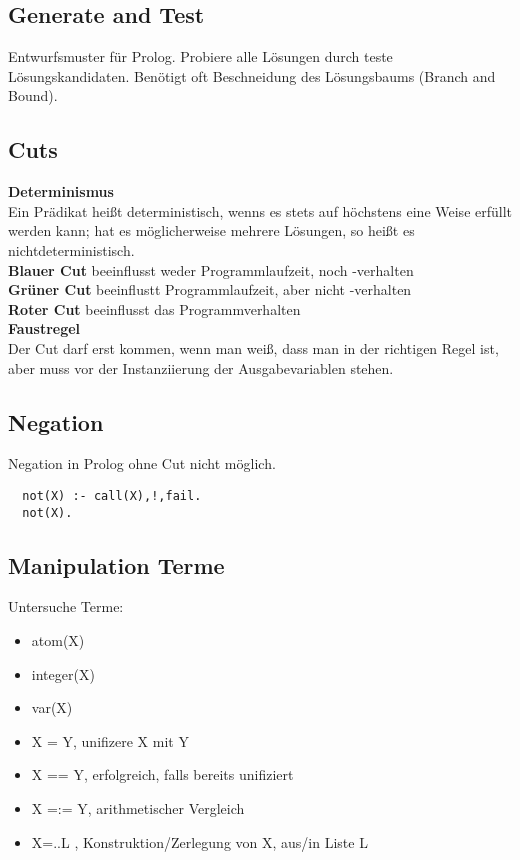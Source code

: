 \subsection{Generate and Test}%
\label{lp:sub:generate-and-test}
Entwurfsmuster für Prolog. Probiere alle Lösungen durch teste Lösungskandidaten. Benötigt oft Beschneidung des
Lösungsbaums (Branch and Bound).

\subsection{Cuts}%
\label{lp:sub:cuts}
\textbf{Determinismus}\\
Ein Prädikat heißt deterministisch, wenns es stets auf höchstens eine Weise erfüllt werden kann; hat es
möglicherweise mehrere Lösungen, so heißt es nichtdeterministisch.\\

\textbf{Blauer Cut} beeinflusst weder Programmlaufzeit, noch -verhalten\\
\textbf{Grüner Cut} beeinflustt Programmlaufzeit, aber nicht -verhalten\\
\textbf{Roter Cut} beeinflusst das Programmverhalten\\

\textbf{Faustregel}\\
Der Cut darf erst kommen, wenn man weiß, dass man in der richtigen Regel ist, aber muss vor der
Instanziierung der Ausgabevariablen stehen.

\subsection{Negation}%
\label{lp:sub:negation}
Negation in Prolog ohne Cut nicht möglich.
\begin{lstlisting}
  not(X) :- call(X),!,fail.
  not(X).
\end{lstlisting}

\subsection{Manipulation Terme}%
\label{lp:sub:manipulation-terme}
Untersuche Terme:
\begin{itemize}
  \item atom(X)
  \item integer(X)
  \item var(X)
  \item X = Y, unifizere X mit Y
  \item X == Y, erfolgreich, falls bereits unifiziert
  \item X =:= Y, arithmetischer Vergleich
  \item X=..L , Konstruktion/Zerlegung von X, aus/in Liste L
\end{itemize}

